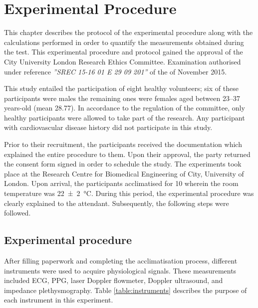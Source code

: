 
\chapter{Experimental Procedure}  %
\label{chapter procedure}

\ifpdf
    \graphicspath{{Chapter5/Figs/Raster/}{Chapter5/Figs/PDF/}{Chapter5/Figs/}}
\else
    \graphicspath{{Chapter5/Figs/Vector/}{Chapter5/Figs/}}
\fi

This chapter describes the protocol of the experimental procedure along with the calculations performed in order to quantify the measurements obtained during the test. This experimental procedure and protocol gained the approval of the City University London Research Ethics Committee. Examination authorised under reference \textit{''SREC 15-16 01 E 29 09 201''} of the  of November 2015. 

This study entailed the participation of eight healthy volunteers; six of these participants were males the remaining ones were females aged between \numrange{23}{37} years-old (mean 28.77). In accordance to the regulation of the committee, only healthy participants were allowed to take part of the research. Any participant with cardiovascular disease history did not participate in this study. 

Prior to their recruitment, the participants received the documentation which explained the entire procedure to them. Upon their approval, the party returned the consent form signed in order to schedule the study. The experiments took place at the Research Centre for Biomedical Engineering of City, University of London. Upon arrival, the participants acclimatised for \SI{10}{\min} wherein the room temperature was \SI{22(2)}{\degreeCelsius}. During this period, the experimental procedure was clearly explained to the attendant. Subsequently, the following steps were followed.

\section{Experimental procedure} %
\label{section procedure 1}

After filling paperwork and completing the acclimatisation process, different instruments were used to acquire physiological signals. These measurements included ECG, PPG, laser Doppler flowmeter, Doppler ultrasound, and impedance plethysmography. Table \ref{table:instruments} describes the purpose of each instrument in this experiment. 

